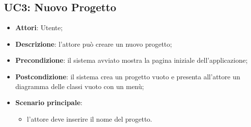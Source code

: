 \subsection{UC3: Nuovo Progetto}
\label{UC3}
\begin{itemize}
	\item \textbf{Attori}: Utente;
	\item \textbf{Descrizione}: l'attore può creare un nuovo progetto;
	\item \textbf{Precondizione}: il sistema avviato mostra la pagina iniziale dell'applicazione;
	\item \textbf{Postcondizione}: il sistema crea un progetto vuoto e presenta all'attore un diagramma delle classi vuoto con un menù;
	\item \textbf{Scenario principale}:
	\begin{itemize} %
		\item l'attore deve inserire il nome del progetto.
	\end{itemize}
\end{itemize}

